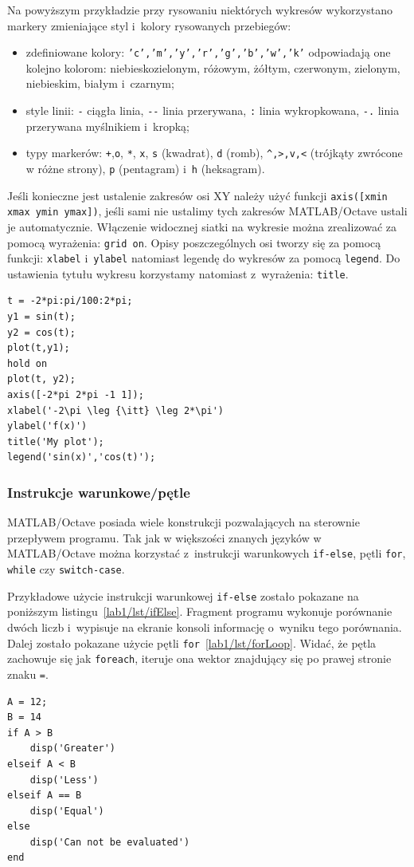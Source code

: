 Na powyższym przykładzie przy rysowaniu niektórych wykresów wykorzystano markery zmieniające styl i~kolory rysowanych przebiegów:
\begin{itemize}
	\item zdefiniowane kolory: \texttt{'c','m','y','r','g','b','w','k'} odpowiadają one kolejno kolorom: niebieskozielonym, różowym, żółtym, czerwonym, zielonym, niebieskim, białym i~czarnym;
	\item style linii: \texttt{-} ciągła linia, \texttt{-}\texttt{-} linia przerywana, \texttt{:} linia wykropkowana, \texttt{-.} linia przerywana myślnikiem i~kropką;
	\item typy markerów: \texttt{+},\texttt{o}, \texttt{*}, \texttt{x}, \texttt{s} (kwadrat), \texttt{d} (romb), \texttt{\^{},>,v,<} (trójkąty zwrócone w różne strony), \texttt{p} (pentagram) i~\texttt{h} (heksagram). 
\end{itemize}

Jeśli konieczne jest ustalenie zakresów osi XY należy użyć funkcji \texttt{axis([xmin xmax ymin ymax])}, jeśli sami nie ustalimy tych zakresów MATLAB/Octave ustali je automatycznie. Włączenie widocznej siatki na wykresie można zrealizować za pomocą wyrażenia: \texttt{grid on}. Opisy poszczególnych osi tworzy się za pomocą funkcji: \texttt{xlabel} i~\texttt{ylabel} natomiast legendę do wykresów za pomocą \texttt{legend}. Do ustawienia tytułu wykresu korzystamy natomiast z~wyrażenia: \texttt{title}.
\begin{lstlisting}[caption=Nazywanie osi dodawanie tytułu oraz legendy i zmiana zakresów osi układu współrzędnych , label=lab1/lst/plotLabelsTitleAxisLegend]
t = -2*pi:pi/100:2*pi;
y1 = sin(t);
y2 = cos(t);
plot(t,y1);
hold on
plot(t, y2);
axis([-2*pi 2*pi -1 1]);
xlabel('-2\pi \leg {\itt} \leg 2*\pi')
ylabel('f(x)')
title('My plot');
legend('sin(x)','cos(t)');
\end{lstlisting} 

\subsubsection{Instrukcje warunkowe/pętle}
MATLAB/Octave posiada wiele konstrukcji pozwalających na sterownie przepływem programu. Tak jak w większości znanych języków w MATLAB/Octave można korzystać z~instrukcji warunkowych \texttt{if-else}, pętli \texttt{for}, \texttt{while} czy \texttt{switch-case}. 

Przykładowe użycie instrukcji warunkowej \texttt{if-else} zostało pokazane na poniższym listingu~\ref{lab1/lst/ifElse}. Fragment programu wykonuje porównanie dwóch liczb i~wypisuje na ekranie konsoli informację o~wyniku tego porównania. Dalej zostało pokazane użycie pętli \texttt{for}~\ref{lab1/lst/forLoop}. Widać, że pętla zachowuje się jak \texttt{foreach}, iteruje ona wektor znajdujący się po prawej stronie znaku \texttt{=}. 
\begin{lstlisting}[caption=Porównywanie dwóch liczb z wykorzystaniem instrukcji \texttt{if-else}, label=lab1/lst/ifElse]
A = 12;
B = 14
if A > B
	disp('Greater')
elseif A < B
	disp('Less')
elseif A == B
	disp('Equal')
else
	disp('Can not be evaluated')
end
\end{lstlisting} 

